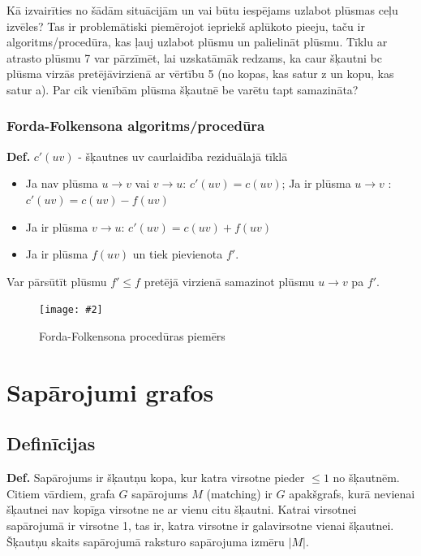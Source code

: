 \documentclass{article}
\newcommand{\illustration}[3]{
	\begin{figure}[H]
		\centering	
		\texttt{[image: \#2]}
		\caption{#3}
	\end{figure}
}
\begin{document}
Kā izvairīties no šādām situācijām un vai būtu iespējams uzlabot plūsmas ceļu izvēles? Tas ir problemātiski piemērojot iepriekš aplūkoto pieeju, taču ir algoritms/procedūra, kas ļauj uzlabot plūsmu un palielināt plūsmu.  Tīklu ar atrasto plūsmu 7 var pārzīmēt, lai uzskatāmāk redzams, ka caur šķautni bc plūsma virzās pretējāvirzienā ar vērtību 5 (no kopas, kas satur z un kopu, kas satur a).  Par cik vienībām plūsma šķautnē be varētu tapt samazināta?

\subsubsection{Forda-Folkensona algoritms/procedūra}

\textbf{Def.} $c'(uv)$ - šķautnes uv caurlaidība reziduālajā tīklā
\begin{itemize}
	\item Ja nav plūsma $u \to v$ vai $v \to u$: $c' (uv ) = c(uv )$; Ja ir plūsma $u → v$ : $c' (uv ) = c(uv ) − f (uv )$
	\item Ja ir plūsma $v \to u$: $c' (uv ) = c(uv ) + f (uv )$
	\item Ja ir plūsma $f(uv)$ un tiek pievienota $f'$.
\end{itemize}

Var pārsūtīt plūsmu $f' \le f$ pretējā virzienā samazinot plūsmu $u \to v$ pa $f'$.

\illustration{1}{Ford_Folkenson_proc-1}{Forda-Folkensona procedūras piemērs}

\section{Sapārojumi grafos}
\subsection{Definīcijas}

\textbf{Def.} Sapārojums ir šķautņu kopa, kur katra virsotne pieder $\le 1$ no šķautnēm. Citiem vārdiem, grafa $G$ sapārojums $M$ (matching) ir $G$ apakšgrafs, kurā nevienai šķautnei nav kopīga virsotne ne ar vienu citu šķautni. Katrai virsotnei sapārojumā ir virsotne 1, tas ir, katra virsotne ir galavirsotne vienai šķautnei. Šķautņu skaits sapārojumā raksturo sapārojuma izmēru $|M|$.
\end{document}

